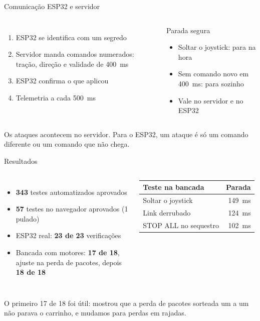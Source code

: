 \documentclass[aspectratio=169,10pt]{beamer}
\newcommand{\ideia}[1]{\par\vfill\noindent\colorbox{verde!12}{\parbox{\dimexpr\linewidth-2\fboxsep\relax}{\small\strut #1\strut}}}
\begin{document}
\begin{frame}{Comunicação ESP32 e servidor}
\begin{columns}[T]
\small
\begin{enumerate}
  \item ESP32 se identifica com um segredo
  \item Servidor manda comandos numerados: tração, direção e validade de 400~ms
  \item ESP32 confirma o que aplicou
  \item Telemetria a cada 500~ms
\end{enumerate}
\begin{block}{Parada segura}
\small
\begin{itemize}
  \item Soltar o joystick: para na hora
  \item Sem comando novo em 400~ms: para sozinho
  \item Vale no servidor e no ESP32
\end{itemize}
\end{block}
\end{columns}
\ideia{Os ataques acontecem no servidor. Para o ESP32, um ataque é só um comando diferente ou um comando que não chega.}
\end{frame}

\begin{frame}{Resultados}
\begin{columns}[T]
\begin{itemize}\small
  \item \textbf{343} testes automatizados aprovados
  \item \textbf{57} testes no navegador aprovados (1 pulado)
  \item ESP32 real: \textbf{23 de 23} verificações
  \item Bancada com motores: \textbf{17 de 18}, ajuste na perda de pacotes, depois \textbf{18 de 18}
\end{itemize}
\small
\begin{tabular}{@{}lr@{}}
\toprule
\textbf{Teste na bancada} & \textbf{Parada} \\
\midrule
Soltar o joystick & 149~ms \\
Link derrubado & 124~ms \\
STOP ALL no sequestro & 102~ms \\
\bottomrule
\end{tabular}
\end{columns}
\ideia{O primeiro 17 de 18 foi útil: mostrou que a perda de pacotes sorteada um a um não parava o carrinho, e mudamos para perdas em rajadas.}
\end{frame}
\end{document}
